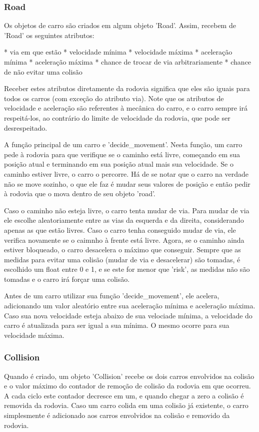\documentclass{article}
\begin{document}
    \subsubsection{Road}
    Os objetos de carro são criados em algum objeto 'Road'. Assim, recebem de 'Road' os seguintes atributos:

    * via em que estão
    * velocidade mínima
    * velocidade máxima
    * aceleração mínima
    * aceleração máxima
    * chance de trocar de via arbitrariamente
    * chance de não evitar uma colisão

    Receber estes atributos diretamente da rodovia significa que eles são iguais para todos os carros (com
    exceção do atributo via). Note que os atributos de velocidade e aceleração são referentes à mecânica do
    carro, e o carro sempre irá respeitá-los, ao contrário do limite de velocidade da rodovia, que pode ser
    desrespeitado.

    A função principal de um carro e 'decide_movement'. Nesta função, um carro pede à rodovia para que verifique
    se o caminho está livre, começando em sua posição atual e terminando em sua posição atual mais sua velocidade.
    Se o caminho estiver livre, o carro o percorre. Há de se notar que o carro na verdade não se move sozinho, o que
    ele faz é mudar seus valores de posição e então pedir à rodovia que o mova dentro de seu objeto 'road'.

    Caso o caminho não esteja livre, o carro tenta mudar de via. Para mudar de via ele escolhe aleatoriamente entre
    as vias da esquerda e da direita, considerando apenas as que estão livres. Caso o carro tenha conseguido mudar
    de via, ele verifica novamente se o caimnho à frente está livre. Agora, se o caminho ainda estiver bloqueado, o
    carro desacelera o máximo que conseguir. Sempre que as medidas para evitar uma colisão (mudar de via e desacelerar)
    são tomadas, é escolhido um float entre 0 e 1, e se este for menor que 'risk', as medidas não são tomadas e o
    carro irá forçar uma colisão.

    Antes de um carro utilizar sua função 'decide_movement', ele acelera, adicionando um valor aleatório entre sua
    aceleração mínima e aceleração máxima. Caso sua nova velocidade esteja abaixo de sua velociade mínima, a velocidade
    do carro é atualizada para ser igual a sua mínima. O mesmo ocorre para sua velocidade máxima.
    
    \subsubsection*{Collision}
    Quando é criado, um objeto 'Collision' recebe os dois carros envolvidos na colisão e o valor máximo do contador de
    remoção de colisão da rodovia em que ocorreu. A cada ciclo este contador decresce em um, e quando chegar a zero a
    colisão é removida da rodovia. Caso um carro colida em uma colisão já existente, o carro simplesmente é adicionado
    aos carros envolvidos na colisão e removido da rodovia.
\end{document}
